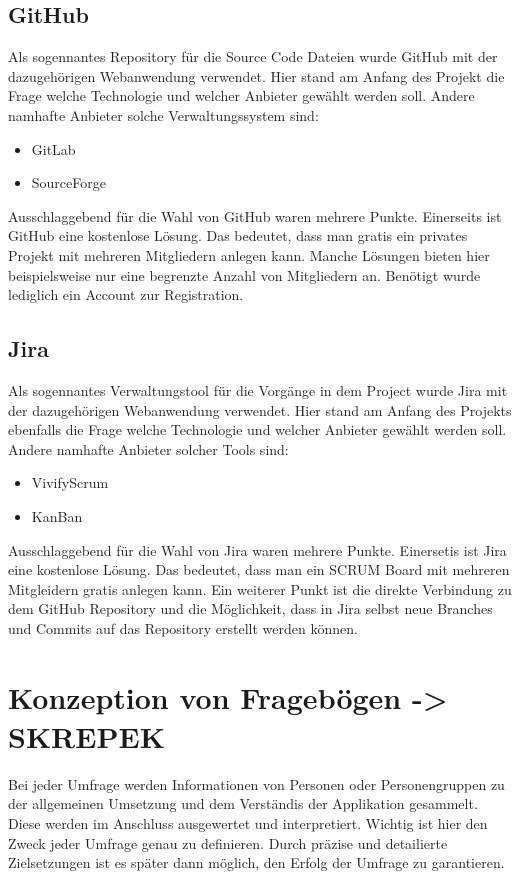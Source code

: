 \subsection{GitHub}
Als sogennantes Repository für die Source Code Dateien wurde GitHub mit der dazugehörigen
Webanwendung verwendet. Hier stand am Anfang des Projekt die Frage welche Technologie und
welcher Anbieter gewählt werden soll. Andere namhafte Anbieter solche Verwaltungssystem sind:
\begin{itemize}
    \item GitLab
    \item SourceForge
\end{itemize}
Ausschlaggebend für die Wahl von GitHub waren mehrere Punkte. Einerseits ist GitHub eine
kostenlose Lösung. Das bedeutet, dass man gratis ein privates Projekt mit mehreren Mitgliedern
anlegen kann. Manche Lösungen bieten hier beispielsweise nur eine begrenzte Anzahl von
Mitgliedern an. Benötigt wurde lediglich ein Account zur Registration.

\subsection{Jira}
Als sogennantes Verwaltungstool für die Vorgänge in dem Project wurde Jira mit der dazugehörigen
Webanwendung verwendet. Hier stand am Anfang des Projekts ebenfalls die Frage welche Technologie
und welcher Anbieter gewählt werden soll. Andere namhafte Anbieter solcher Tools sind:
\begin{itemize}
    \item VivifyScrum
    \item KanBan
\end{itemize}
Ausschlaggebend für die Wahl von Jira waren mehrere Punkte. Einersetis ist Jira eine kostenlose
Lösung. Das bedeutet, dass man ein SCRUM Board mit mehreren Mitgleidern gratis anlegen kann.
Ein weiterer Punkt ist die direkte Verbindung zu dem GitHub Repository und die Möglichkeit,
dass in Jira selbst neue Branches und Commits auf das Repository erstellt werden können.

\section{Konzeption von Fragebögen -> SKREPEK}
Bei jeder Umfrage werden Informationen von Personen oder Personengruppen zu der allgemeinen
Umsetzung und dem Verständis der Applikation gesammelt. Diese werden im Anschluss ausgewertet und
interpretiert. Wichtig ist hier den Zweck jeder Umfrage genau zu definieren. Durch präzise und
detailierte Zielsetzungen ist es später dann möglich, den Erfolg der Umfrage zu garantieren.

